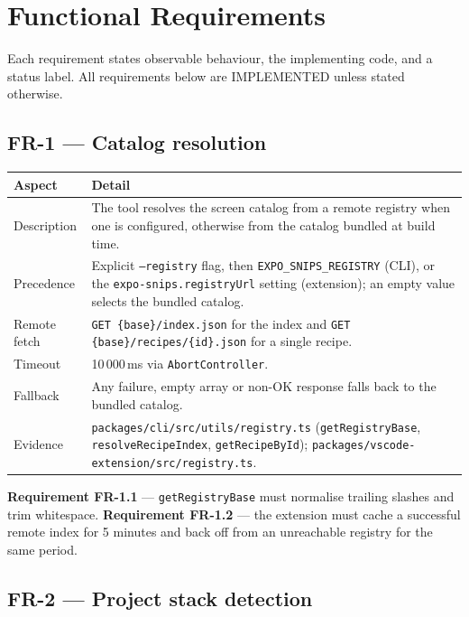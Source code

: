 \chapter{Functional Requirements}
\label{ch:functional-requirements}

Each requirement states observable behaviour, the implementing code, and a status
label. All requirements below are IMPLEMENTED unless stated otherwise.

\section{FR-1 --- Catalog resolution}

\begin{longtable}{@{}L{3cm}L{11cm}@{}}
\toprule
\textbf{Aspect} & \textbf{Detail} \\
\midrule
\endhead
Description & The tool resolves the screen catalog from a remote registry when one is
configured, otherwise from the catalog bundled at build time. \\
Precedence & Explicit \texttt{--registry} flag, then \texttt{EXPO\_SNIPS\_REGISTRY}
(CLI), or the \texttt{expo-snips.registryUrl} setting (extension); an empty value
selects the bundled catalog. \\
Remote fetch & \texttt{GET \{base\}/index.json} for the index and
\texttt{GET \{base\}/recipes/\{id\}.json} for a single recipe. \\
Timeout & 10\,000\,ms via \texttt{AbortController}. \\
Fallback & Any failure, empty array or non-OK response falls back to the bundled catalog. \\
Evidence & \texttt{packages/cli/src/utils/registry.ts} (\texttt{getRegistryBase},
\texttt{resolveRecipeIndex}, \texttt{getRecipeById});
\texttt{packages/vscode-extension/src/registry.ts}. \\
\bottomrule
\end{longtable}

\textbf{Requirement FR-1.1} --- \texttt{getRegistryBase} must normalise trailing
slashes and trim whitespace.
\textbf{Requirement FR-1.2} --- the extension must cache a successful remote index
for 5 minutes and back off from an unreachable registry for the same period.

\section{FR-2 --- Project stack detection}

